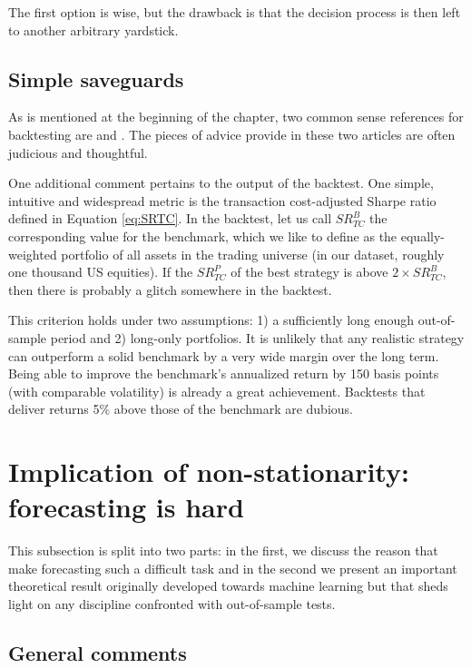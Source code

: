 \documentclass[]{krantz}
\theoremstyle{definition}
\theoremstyle{definition}
\theoremstyle{definition}
\theoremstyle{remark}
\begin{document}
The first option is wise, but the drawback is that the decision process
is then left to another arbitrary yardstick.

\hypertarget{simple-saveguards}{%
\subsection{Simple saveguards}\label{simple-saveguards}}

As is mentioned at the beginning of the chapter, two common sense
references for backtesting are \citet{fabozzi2018being} and
\citet{arnott2019backtesting}. The pieces of advice provide in these two
articles are often judicious and thoughtful.

One additional comment pertains to the output of the backtest. One
simple, intuitive and widespread metric is the transaction cost-adjusted
Sharpe ratio defined in Equation \eqref{eq:SRTC}. In the backtest, let us
call \(SR_{TC}^B\) the corresponding value for the benchmark, which we
like to define as the equally-weighted portfolio of all assets in the
trading universe (in our dataset, roughly one thousand US equities). If
the \(SR_{TC}^P\) of the best strategy is above \(2\times SR_{TC}^B\),
then there is probably a glitch somewhere in the backtest.

This criterion holds under two assumptions: 1) a sufficiently long
enough out-of-sample period and 2) long-only portfolios. It is unlikely
that any realistic strategy can outperform a solid benchmark by a very
wide margin over the long term. Being able to improve the benchmark's
annualized return by 150 basis points (with comparable volatility) is
already a great achievement. Backtests that deliver returns 5\% above
those of the benchmark are dubious.

\hypertarget{implication-of-non-stationarity-forecasting-is-hard}{%
\section{Implication of non-stationarity: forecasting is
hard}\label{implication-of-non-stationarity-forecasting-is-hard}}

This subsection is split into two parts: in the first, we discuss the
reason that make forecasting such a difficult task and in the second we
present an important theoretical result originally developed towards
machine learning but that sheds light on any discipline confronted with
out-of-sample tests.

\hypertarget{general-comments}{%
\subsection{General comments}\label{general-comments}}
\end{document}
